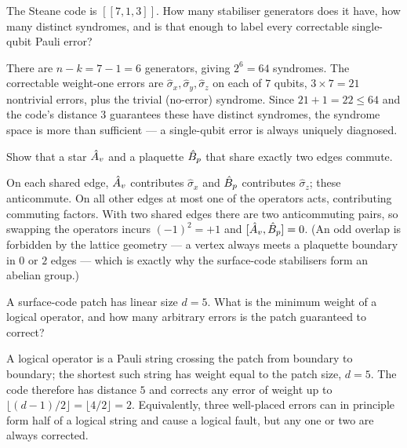 \begin{exercise}
The Steane code is $[[7,1,3]]$. How many stabiliser generators does it
have, how many distinct syndromes, and is that enough to label every
correctable single-qubit Pauli error?
\begin{solution}
There are $n-k=7-1=6$ generators, giving $2^6=64$ syndromes. The
correctable weight-one errors are $\hat\sigma_x,\hat\sigma_y,\hat\sigma_z$
on each of $7$ qubits, $3\times7=21$ nontrivial errors, plus the trivial
(no-error) syndrome. Since $21+1=22\le64$ and the code's distance $3$
guarantees these have distinct syndromes, the syndrome space is more than
sufficient --- a single-qubit error is always uniquely diagnosed.
\end{solution}
\end{exercise}

\begin{exercise}
Show that a star $\hat{A}_v$ and a plaquette $\hat{B}_p$ that share exactly
two edges commute.
\begin{solution}
On each shared edge, $\hat{A}_v$ contributes $\hat\sigma_x$ and $\hat{B}_p$
contributes $\hat\sigma_z$; these anticommute. On all other edges at
most one of the operators acts, contributing commuting factors. With two
shared edges there are two anticommuting pairs, so swapping the operators
incurs $(-1)^2=+1$ and $[\hat{A}_v,\hat{B}_p]=0$. (An odd overlap is
forbidden by the lattice geometry --- a vertex always meets a plaquette
boundary in $0$ or $2$ edges --- which is exactly why the surface-code
stabilisers form an abelian group.)
\end{solution}
\end{exercise}

\begin{exercise}
A surface-code patch has linear size $d=5$. What is the minimum weight of
a logical operator, and how many arbitrary errors is the patch guaranteed
to correct?
\begin{solution}
A logical operator is a Pauli string crossing the patch from boundary to
boundary; the shortest such string has weight equal to the patch size,
$d=5$. The code therefore has distance $5$ and corrects any error of
weight up to $\lfloor(d-1)/2\rfloor=\lfloor4/2\rfloor=2$. Equivalently,
three well-placed errors can in principle form half of a logical string
and cause a logical fault, but any one or two are always corrected.
\end{solution}
\end{exercise}

